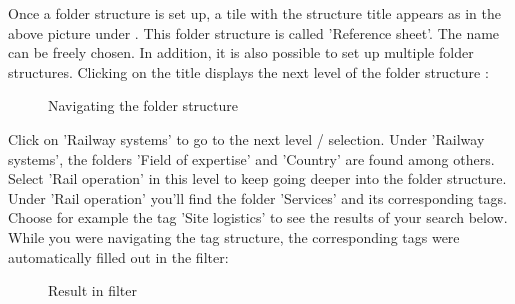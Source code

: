 Once a folder structure is set up, a tile with the structure title appears as in the above picture under . This folder structure is called 'Reference sheet'. The name can be freely chosen. In addition, it is also possible to set up multiple folder structures. Clicking on the title displays the next level of the folder structure :

\begin{figure}[H]
\caption{Navigating the folder structure}
\end{figure}

Click on 'Railway systems'  to go to the next level / selection. Under 'Railway systems', the folders 'Field of expertise' and 'Country' are found among others. Select 'Rail operation'  in this level to keep going deeper into the folder structure. Under 'Rail operation' you'll find the folder 'Services' and its corresponding tags. Choose for example the tag 'Site logistics'  to see the results of your search below. While you were navigating the tag structure, the corresponding tags were automatically filled out in the filter:

\begin{figure}[H]
\caption{Result in filter}
\end{figure}

